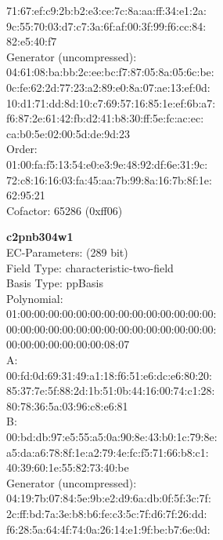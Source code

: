     71:67:ef:c9:2b:b2:e3:ce:7c:8a:aa:ff:34:e1:2a:\\
    9c:55:70:03:d7:c7:3a:6f:af:00:3f:99:f6:cc:84:\\
    82:e5:40:f7\\
Generator (uncompressed):\\
    04:61:08:ba:bb:2c:ee:bc:f7:87:05:8a:05:6c:be:\\
    0c:fe:62:2d:77:23:a2:89:e0:8a:07:ae:13:ef:0d:\\
    10:d1:71:dd:8d:10:c7:69:57:16:85:1e:ef:6b:a7:\\
    f6:87:2e:61:42:fb:d2:41:b8:30:ff:5e:fc:ac:ec:\\
    ca:b0:5e:02:00:5d:de:9d:23\\
Order: \\
    01:00:fa:f5:13:54:e0:e3:9e:48:92:df:6e:31:9c:\\
    72:c8:16:16:03:fa:45:aa:7b:99:8a:16:7b:8f:1e:\\
    62:95:21\\
Cofactor:  65286 (0xff06)\\
\item \textbf{ c2pnb304w1 }\\
EC-Parameters: (289 bit)\\
Field Type: characteristic-two-field\\
Basis Type: ppBasis\\
Polynomial:\\
    01:00:00:00:00:00:00:00:00:00:00:00:00:00:00:\\
    00:00:00:00:00:00:00:00:00:00:00:00:00:00:00:\\
    00:00:00:00:00:00:00:08:07\\
A:   \\
    00:fd:0d:69:31:49:a1:18:f6:51:e6:dc:e6:80:20:\\
    85:37:7e:5f:88:2d:1b:51:0b:44:16:00:74:c1:28:\\
    80:78:36:5a:03:96:c8:e6:81\\
B:   \\
    00:bd:db:97:e5:55:a5:0a:90:8e:43:b0:1c:79:8e:\\
    a5:da:a6:78:8f:1e:a2:79:4e:fc:f5:71:66:b8:c1:\\
    40:39:60:1e:55:82:73:40:be\\
Generator (uncompressed):\\
    04:19:7b:07:84:5e:9b:e2:d9:6a:db:0f:5f:3c:7f:\\
    2c:ff:bd:7a:3e:b8:b6:fe:c3:5c:7f:d6:7f:26:dd:\\
    f6:28:5a:64:4f:74:0a:26:14:e1:9f:be:b7:6e:0d:\\
